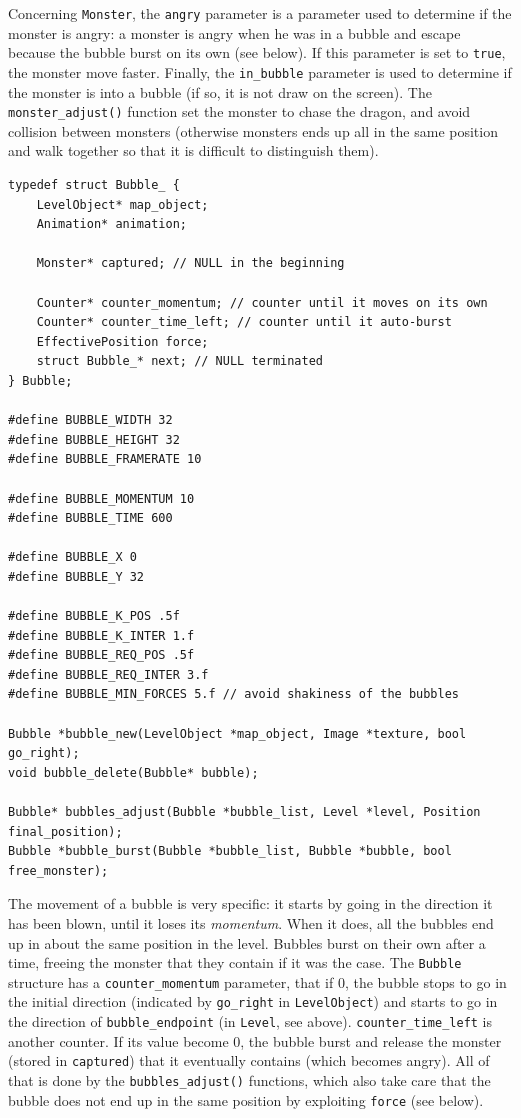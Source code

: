 \documentclass[12pt,a4paper]{article}
\newcommand{\cc}[1]{\texttt{#1}}
\begin{document}
Concerning \cc{Monster}, the \cc{angry} parameter is a parameter used to determine if the monster is angry: a monster is angry when he was in a bubble and escape because the bubble burst on its own (see below). If this parameter is set to \cc{true}, the monster move faster. Finally, the \cc{in_bubble} parameter is used to determine if the monster is into a bubble (if so, it is not draw on the screen). The \cc{monster_adjust()} function set the monster to chase the dragon, and avoid collision between monsters (otherwise monsters ends up all in the same position and walk together so that it is difficult to distinguish them).

\begin{verbatim}
typedef struct Bubble_ {
    LevelObject* map_object;
    Animation* animation;

    Monster* captured; // NULL in the beginning

    Counter* counter_momentum; // counter until it moves on its own
    Counter* counter_time_left; // counter until it auto-burst
    EffectivePosition force;
    struct Bubble_* next; // NULL terminated
} Bubble;

#define BUBBLE_WIDTH 32
#define BUBBLE_HEIGHT 32
#define BUBBLE_FRAMERATE 10

#define BUBBLE_MOMENTUM 10
#define BUBBLE_TIME 600

#define BUBBLE_X 0
#define BUBBLE_Y 32

#define BUBBLE_K_POS .5f
#define BUBBLE_K_INTER 1.f
#define BUBBLE_REQ_POS .5f
#define BUBBLE_REQ_INTER 3.f
#define BUBBLE_MIN_FORCES 5.f // avoid shakiness of the bubbles

Bubble *bubble_new(LevelObject *map_object, Image *texture, bool go_right);
void bubble_delete(Bubble* bubble);

Bubble* bubbles_adjust(Bubble *bubble_list, Level *level, Position final_position);
Bubble *bubble_burst(Bubble *bubble_list, Bubble *bubble, bool free_monster);
\end{verbatim}

The movement of a bubble is very specific: it starts by going in the direction it has been blown, until it loses its \textit{momentum}. When it does, all the bubbles end up in about the same position in the level. Bubbles burst on their own after a time, freeing the monster that they contain if it was the case. The \cc{Bubble} structure has a \cc{counter_momentum} parameter, that if 0, the bubble stops to go in the initial direction (indicated by \cc{go_right} in \cc{LevelObject}) and starts to go in the direction of \cc{bubble_endpoint} (in \cc{Level}, see above). \cc{counter_time_left} is another counter. If its value become 0, the bubble burst and release the monster (stored in \cc{captured}) that it eventually contains (which becomes angry). All of that is done by the \cc{bubbles_adjust()} functions, which also take care that the bubble does not end up in the same position by exploiting \cc{force} (see below).
\end{document}
